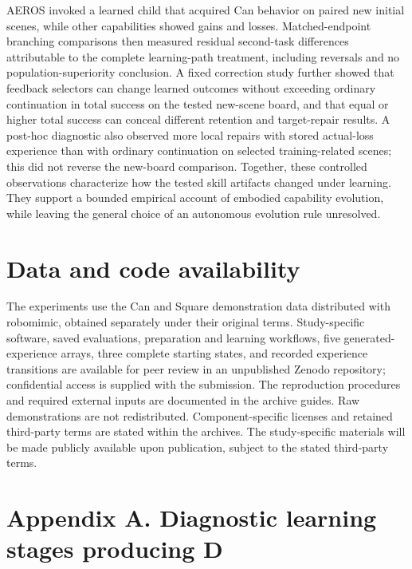 \documentclass[10pt,letterpaper]{article}
\begin{document}
AEROS invoked a learned child that acquired Can behavior on paired new
initial scenes, while other capabilities showed gains and losses.
Matched-endpoint branching comparisons then measured residual
second-task differences attributable to the complete learning-path
treatment, including reversals and no population-superiority conclusion.
A fixed correction study further showed that feedback selectors can
change learned outcomes without exceeding ordinary continuation in total
success on the tested new-scene board, and that equal or higher total
success can conceal different retention and target-repair results. A
post-hoc diagnostic also observed more local repairs with stored
actual-loss experience than with ordinary continuation on selected
training-related scenes; this did not reverse the new-board comparison.
Together, these controlled observations characterize how the tested
skill artifacts changed under learning. They support a bounded empirical
account of embodied capability evolution, while leaving the general
choice of an autonomous evolution rule unresolved.

\section*{Data and code availability}\label{data-and-code-availability}

The experiments use the Can and Square demonstration data distributed
with robomimic, obtained separately under their original terms.
Study-specific software, saved evaluations, preparation and learning
workflows, five generated-experience arrays, three complete starting
states, and recorded experience transitions are available for peer review
in an unpublished Zenodo repository; confidential access is supplied with
the submission. The reproduction procedures and required external inputs
are documented in the archive guides. Raw demonstrations are not
redistributed. Component-specific licenses and
retained third-party terms are stated within the archives.
The study-specific materials will be made publicly available upon
publication, subject to the stated third-party terms.

\section*{Appendix A. Diagnostic learning stages producing
D}\label{appendix-a.-diagnostic-learning-stages-producing-d}
\end{document}

